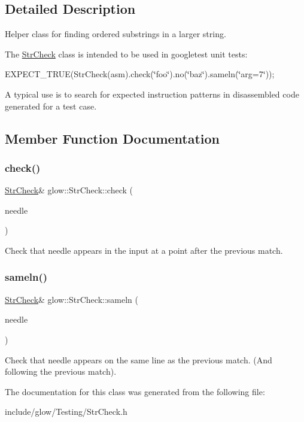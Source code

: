 \subsection{Detailed Description}
Helper class for finding ordered substrings in a larger string.

The \hyperlink{classglow_1_1_str_check}{Str\+Check} class is intended to be used in googletest unit tests\+:

E\+X\+P\+E\+C\+T\+\_\+\+T\+R\+UE(Str\+Check(asm).check(\char`\"{}foo\char`\"{}).no(\char`\"{}baz\char`\"{}).sameln(\char`\"{}arg=7\char`\"{}));

A typical use is to search for expected instruction patterns in disassembled code generated for a test case. 

\subsection{Member Function Documentation}
\mbox{\label{classglow_1_1_str_check_a5f4ae7f23e0ad003b24683e875148f26}} 
\subsubsection{\texorpdfstring{check()}{check()}}
{\footnotesize\ttfamily \hyperlink{classglow_1_1_str_check}{Str\+Check}\& glow\+::\+Str\+Check\+::check (\begin{DoxyParamCaption}\item[{llvm\+::\+String\+Ref}]{needle }\end{DoxyParamCaption})}

Check that {\ttfamily needle} appears in the input at a point after the previous match. \mbox{\label{classglow_1_1_str_check_a83d72ca6e91ae0c3b7ef40609b760a27}} 
\subsubsection{\texorpdfstring{sameln()}{sameln()}}
{\footnotesize\ttfamily \hyperlink{classglow_1_1_str_check}{Str\+Check}\& glow\+::\+Str\+Check\+::sameln (\begin{DoxyParamCaption}\item[{llvm\+::\+String\+Ref}]{needle }\end{DoxyParamCaption})}

Check that {\ttfamily needle} appears on the same line as the previous match. (And following the previous match). 

The documentation for this class was generated from the following file\+:\begin{DoxyCompactItemize}
\item 
include/glow/\+Testing/Str\+Check.\+h\end{DoxyCompactItemize}
